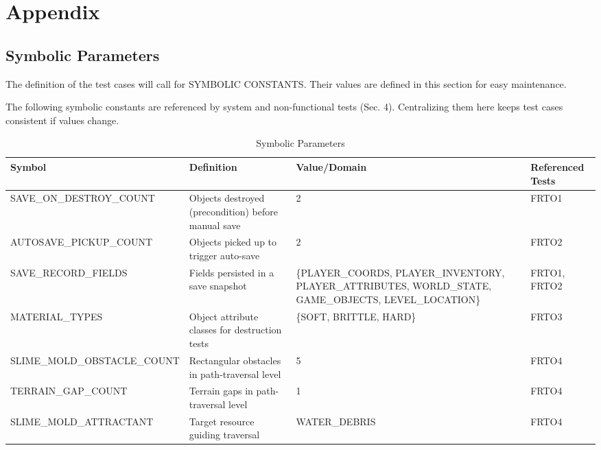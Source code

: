 \documentclass[12pt, titlepage]{article}
\begin{document}
\section{Appendix}

\subsection{Symbolic Parameters}

The definition of the test cases will call for SYMBOLIC CONSTANTS. Their values are defined in this section for easy maintenance.

The following symbolic constants are referenced by system and non-functional tests (Sec. 4). Centralizing them here keeps test cases consistent if values change.

\begin{table}[H]
\caption{Symbolic Parameters}
\begin{tabular}{|p{6.5cm}|p{3.5cm}|p{4.5cm}|p{2cm}|}
\hline
\textbf{Symbol}              & \textbf{Definition}                                 & \textbf{Value/Domain}                                                                                   & \textbf{Referenced Tests} \\ \hline
SAVE\_ON\_DESTROY\_COUNT     & Objects destroyed (precondition) before manual save & 2                                                                                                       & FRTO1                     \\ \hline
AUTOSAVE\_PICKUP\_COUNT      & Objects picked up to trigger auto-save              & 2                                                                                                       & FRTO2                     \\ \hline
SAVE\_RECORD\_FIELDS         & Fields persisted in a save snapshot                 & \{PLAYER\_COORDS, PLAYER\_INVENTORY, PLAYER\_ATTRIBUTES, WORLD\_STATE, GAME\_OBJECTS, LEVEL\_LOCATION\} & FRTO1, FRTO2              \\ \hline
MATERIAL\_TYPES              & Object attribute classes for destruction tests      & \{SOFT, BRITTLE, HARD\}                                                                                 & FRTO3                     \\ \hline
SLIME\_MOLD\_OBSTACLE\_COUNT & Rectangular obstacles in path-traversal level       & 5                                                                                                       & FRTO4                     \\ \hline
TERRAIN\_GAP\_COUNT          & Terrain gaps in path-traversal level                & 1                                                                                                       & FRTO4                     \\ \hline
SLIME\_MOLD\_ATTRACTANT      & Target resource guiding traversal                   & WATER\_DEBRIS                                                                                           & FRTO4                     \\ \hline
\end{tabular}%
\end{table}
\end{document}
